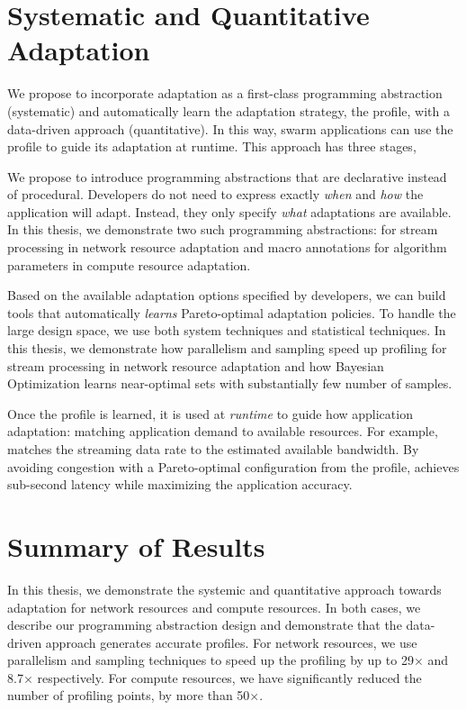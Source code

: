 \documentclass[thesis.tex]{subfiles}
\begin{document}
\section{Systematic and Quantitative Adaptation}
\label{sec:adaptation}

We propose to incorporate adaptation as a first-class programming abstraction
(systematic) and automatically learn the adaptation strategy, the profile, with
a data-driven approach (quantitative). In this way, swarm applications can use
the profile to guide its adaptation at runtime. This approach has three stages,

 We propose to introduce programming
abstractions that are declarative instead of procedural. Developers do not need
to express exactly \emph{when} and \emph{how} the application will
adapt. Instead, they only specify \emph{what} adaptations are available. In this
thesis, we demonstrate two such programming abstractions: \maybe{} for stream
processing in network resource adaptation and macro annotations for algorithm
parameters in compute resource adaptation.

 Based on the available adaptation
options specified by developers, we can build tools that automatically
\emph{learns} Pareto-optimal adaptation policies. To handle the large design
space, we use both system techniques and statistical techniques. In this thesis,
we demonstrate how parallelism and sampling speed up profiling for stream
processing in network resource adaptation and how Bayesian Optimization learns
near-optimal sets with substantially few number of samples.

 Once the profile is learned, it is used at
\emph{runtime} to guide how application adaptation: matching application demand
to available resources. For example, \awstream{} matches the streaming data rate
to the estimated available bandwidth. By avoiding congestion with a
Pareto-optimal configuration from the profile, \awstream{} achieves sub-second
latency while maximizing the application accuracy.

\section{Summary of Results}
\label{sec:summary-results-1}

In this thesis, we demonstrate the systemic and quantitative approach towards
adaptation for network resources and compute resources. In both cases, we
describe our programming abstraction design and demonstrate that the data-driven
approach generates accurate profiles. For network resources, we use parallelism
and sampling techniques to speed up the profiling by up to 29$\times$ and
8.7$\times$ respectively. For compute resources, we have significantly reduced
the number of profiling points, by more than 50$\times$.
\end{document}
